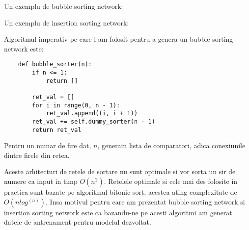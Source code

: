 \documentclass{article}%
\begin{document}
Un exemplu de bubble sorting network:
\begin{center}
\end{center}

Un exemplu de insertion sorting network:

\begin{center}
\end{center}

Algoritmul imperativ pe care l-am folosit pentru a genera un bubble sorting network este:
\begin{lstlisting}
    def bubble_sorter(n):
        if n <= 1:
            return []

        ret_val = []
        for i in range(0, n - 1):
            ret_val.append((i, i + 1))
        ret_val += self.dummy_sorter(n - 1)
        return ret_val
\end{lstlisting}
Pentru un numar de fire dat, $n$, generam lista de comparatori, adica conexiunile dintre firele din retea.

    Aceste arhitecturi de retele de sortare nu sunt optimale si vor sorta un sir de numere ca input in timp
$O(n^2)$. Retelele optimale si cele mai des folosite in practica sunt bazate pe algoritmul bitonic sort, acestea ating complexitate de $O(nlog^(n))$. Insa motivul pentru care am prezentat bubble sorting network si insertion sorting network este
ca bazandu-ne pe acesti algoritmi am generat datele de antrenament pentru modelul dezvoltat.
\end{document}
